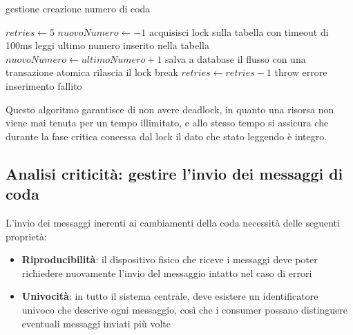 \documentclass[a4paper, titlepage, 12pt, openright, twoside]{book}
\begin{document}
\begin{algorithm}
\caption{gestione creazione numero di coda}
\begin{algorithmic}[1]
\State $retries \gets 5$
\State $nuovoNumero \gets -1$
\State acquisisci lock sulla tabella con timeout di 100ms
\State leggi ultimo numero inserito nella tabella
\State $nuovoNumero \gets ultimoNumero + 1$
\State salva a database il flusso con una transazione atomica
\State rilascia il lock
\State break
\Else
\State $retries \gets retries - 1$
\EndIf
\EndWhile
{}
\State throw errore inserimento fallito
\EndIf
\end{algorithmic}
\end{algorithm}

Questo algoritmo garantisce di non avere deadlock, in quanto una risorsa non viene mai tenuta per un tempo illimitato, e allo stesso tempo si assicura che durante la fase critica concessa dal lock il dato che stato leggendo è integro.

\subsection{Analisi criticità: gestire l'invio dei messaggi di coda}

L'invio dei messaggi inerenti ai cambiamenti della coda necessità delle seguenti proprietà:

\begin{itemize}
	\item \textbf{Riproducibilità}: il dispositivo fisico che riceve i messaggi deve poter richiedere nuovamente l'invio del messaggio intatto nel caso di errori
	\item \textbf{Univocità}: in tutto il sistema centrale, deve esistere un identificatore univoco che descrive ogni messaggio, così che i consumer possano distinguere eventuali messaggi inviati più volte
\end{itemize}
\end{document}
